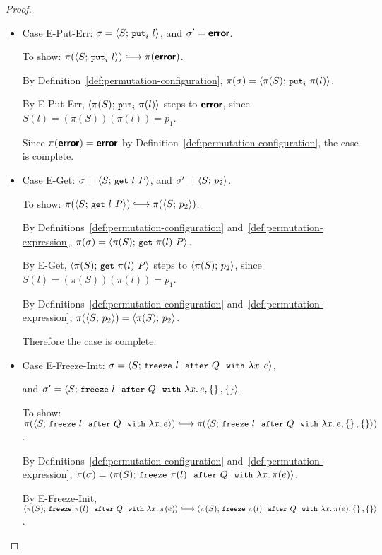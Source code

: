 \begin{proof}
\begin{itemize}
  \item Case {\sc E-Put-Err}: $\sigma = \langle S;\, \mbox{\small{\texttt{put}}}_i~l \rangle$,
    and $\sigma' = \textbf{\textsf{error}}$.

    To show: $\pi(\config{S}{\putiexp{l}}) \parstepsto
    \pi(\error)$.

    By Definition~\ref{def:permutation-configuration}, $\pi(\sigma) =
    \langle \pi(S);\, \mbox{\small{\texttt{put}}}_i~\pi(l) \rangle$.

    By {\sc E-Put-Err}, $\langle \pi(S);\, \mbox{\small{\texttt{put}}}_i~\pi(l) \rangle$ steps to
    $\textbf{\textsf{error}}$, since $S(l) = (\pi(S))(\pi(l)) = p_1$.

    Since $\pi(\textbf{\textsf{error}}) = \textbf{\textsf{error}}$ by
    Definition~\ref{def:permutation-configuration}, the case is
    complete.

  \item Case {\sc E-Get}: $\sigma = \langle S;\, \mbox{\small{\texttt{get}}}~l~P \rangle$, and
    $\sigma' = \langle S;\, p_2 \rangle$.

    To show: $\pi(\config{S}{\getexp{l}{P}}) \parstepsto
    \pi(\config{S}{p_2})$.

    By Definitions~\ref{def:permutation-configuration}
    and~\ref{def:permutation-expression}, $\pi(\sigma) =
    \langle \pi(S);\, \mbox{\small{\texttt{get}}}~\pi(l)~P \rangle$.

    By {\sc E-Get}, $\langle \pi(S);\, \mbox{\small{\texttt{get}}}~\pi(l)~P \rangle$ steps to
    $\langle \pi(S);\, p_2 \rangle$, since $S(l) = (\pi(S))(\pi(l)) = p_1$.

    By Definitions~\ref{def:permutation-configuration}
    and~\ref{def:permutation-expression}, $\pi(\langle S;\, p_2 \rangle) =
    \langle \pi(S);\, p_2 \rangle$.

    Therefore the case is complete.

  \item Case {\sc E-Freeze-Init}: $\sigma =
    \langle S;\, \mbox{\small{\texttt{freeze}}}~l~~{\mbox{\small{\texttt{after}}}}~Q~~{\mbox{\small{\texttt{with}}}}~\lambda x.\,e \rangle$,

    and $\sigma' =
    \langle S;\, \mbox{\small{\texttt{freeze}}}~l~~{\mbox{\small{\texttt{after}}}}~Q~~{\mbox{\small{\texttt{with}}}}~\lambda x.\,e, \left\{\right\}, \left\{\right\} \rangle$.

    To show: $\pi(\config{S}{\freezeafter{l}{Q}{\lam{x}{e}}})
    \parstepsto \\
    \pi(\config{S}{\freezeafterfull{l}{Q}{\lam{x}{e}}{\setof{}}{\setof{}}})$.

    By Definitions~\ref{def:permutation-configuration}
    and~\ref{def:permutation-expression}, $\pi(\sigma) =
    \langle \pi(S);\, \mbox{\small{\texttt{freeze}}}~\pi(l)~~{\mbox{\small{\texttt{after}}}}~Q~~{\mbox{\small{\texttt{with}}}}~\lambda x.\,\pi(e) \rangle$.

    By {\sc E-Freeze-Init},
    $\config{\pi(S)}{\freezeafter{\pi(l)}{Q}{\lam{x}{\pi(e)}}}
    \parstepsto \\
    \config{\pi(S)}{\freezeafterfull{\pi(l)}{Q}{\lam{x}{\pi(e)}}{\setof{}}{\setof{}}}$.


\end{itemize}
\end{proof}
